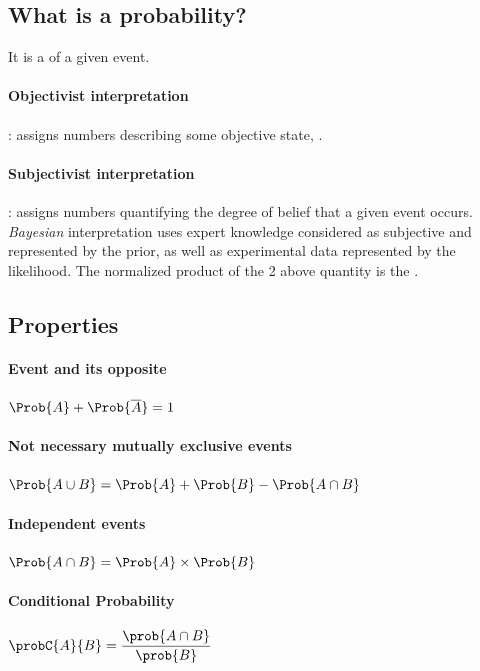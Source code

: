 \subsection{What is a probability?}
It is a  of a given event.

\paragraph{Objectivist interpretation \cite{wiki:probability_interpretation}}: assigns
numbers describing some objective state, . 

\paragraph{Subjectivist interpretation \cite{wiki:probability_interpretation}}: assigns
numbers quantifying the degree of belief that a given event occurs. \textit{Bayesian} 
interpretation uses expert knowledge considered as subjective and represented by the 
prior, as well as experimental data represented by the likelihood. The normalized product
of the 2 above quantity is the .


\subsection{Properties}
\paragraph{Event and its opposite}
$\Prob{A} + \Prob{\overline{A}} = 1$
\paragraph{Not necessary mutually exclusive events}
$\Prob{A\cup B} = \Prob{A} + \Prob{B} - \Prob{A\cap B}$
\paragraph{Independent events}
$\Prob{A\cap B} = \Prob{A} \times \Prob{B}$
\paragraph{Conditional Probability}
$\probC{A}{B} = \dfrac{\prob{A\cap B}}{\prob{B}}$
